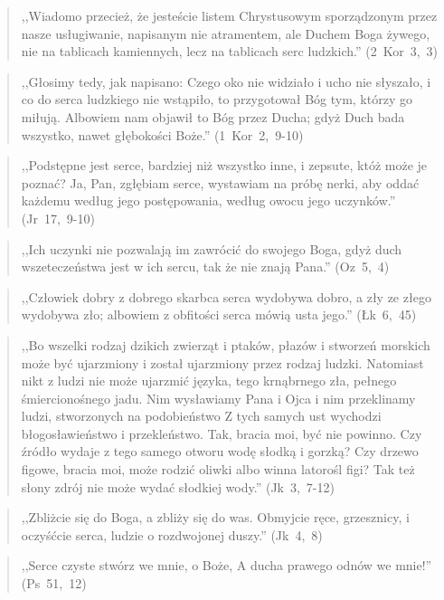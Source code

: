 \documentclass[10pt,a4paper,oneside]{article}
\begin{document}
\begin{quote}
,,Wiadomo przecież, że jesteście listem Chrystusowym sporządzonym przez nasze usługiwanie, napisanym nie atramentem, ale Duchem Boga żywego, nie na tablicach kamiennych, lecz na tablicach serc ludzkich.'' \mbox{(2 Kor 3, 3)}
\end{quote}
\begin{quote}
,,Głosimy tedy, jak napisano: Czego oko nie widziało i ucho nie słyszało, i co do serca ludzkiego nie wstąpiło, to przygotował Bóg tym, którzy go miłują. Albowiem nam objawił to Bóg przez Ducha; gdyż Duch bada wszystko, nawet głębokości Boże.'' \mbox{(1 Kor 2, 9-10)}
\end{quote}
\begin{quote}
,,Podstępne jest serce, bardziej niż wszystko inne, i zepsute, któż może je poznać? Ja, Pan, zgłębiam serce, wystawiam na próbę nerki, aby oddać każdemu według jego postępowania, według owocu jego uczynków.'' \mbox{(Jr 17, 9-10)}
\end{quote}
\begin{quote}
,,Ich uczynki nie pozwalają im zawrócić do swojego Boga, gdyż duch wszeteczeństwa jest w ich sercu, tak że nie znają Pana.'' \mbox{(Oz 5, 4)}
\end{quote}
\begin{quote}
,,Człowiek dobry z dobrego skarbca serca wydobywa dobro, a zły ze złego wydobywa zło; albowiem z obfitości serca mówią usta jego.'' \mbox{(Łk 6, 45)}
\end{quote}
\begin{quote}
,,Bo wszelki rodzaj dzikich zwierząt i ptaków, płazów i stworzeń morskich może być ujarzmiony i został ujarzmiony przez rodzaj ludzki. Natomiast nikt z ludzi nie może ujarzmić języka, tego krnąbrnego zła, pełnego śmiercionośnego jadu. Nim wysławiamy Pana i Ojca i nim przeklinamy ludzi, stworzonych na podobieństwo Z tych samych ust wychodzi błogosławieństwo i przekleństwo. Tak, bracia moi, być nie powinno. Czy źródło wydaje z tego samego otworu wodę słodką i gorzką? Czy drzewo figowe, bracia moi, może rodzić oliwki albo winna latorośl figi? Tak też słony zdrój nie może wydać słodkiej wody.'' \mbox{(Jk 3, 7-12)}
\end{quote}
\begin{quote}
,,Zbliżcie się do Boga, a zbliży się do was. Obmyjcie ręce, grzesznicy, i oczyśćcie serca, ludzie o rozdwojonej duszy.'' \mbox{(Jk 4, 8)}
\end{quote}
\begin{quote}
,,Serce czyste stwórz we mnie, o Boże, A ducha prawego odnów we mnie!'' \mbox{(Ps 51, 12)}
\end{quote}
\end{document}
